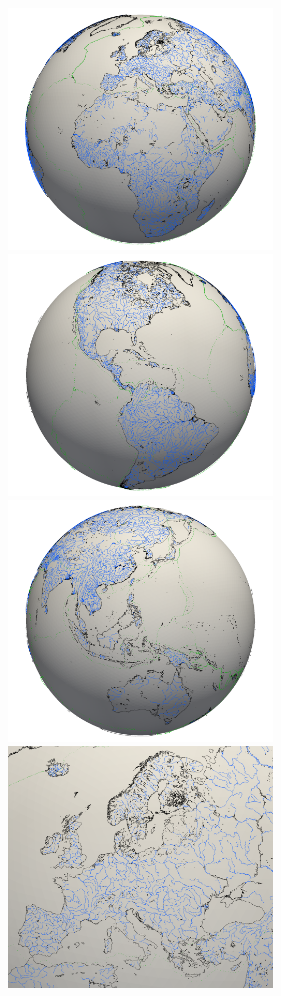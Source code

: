 \begin{center}
\includegraphics[width=7cm]{python_codes/fieldstone_69/images/01}
\includegraphics[width=7cm]{python_codes/fieldstone_69/images/02}\\
\includegraphics[width=7cm]{python_codes/fieldstone_69/images/03}
\includegraphics[width=7cm]{python_codes/fieldstone_69/images/04}
\end{center}

